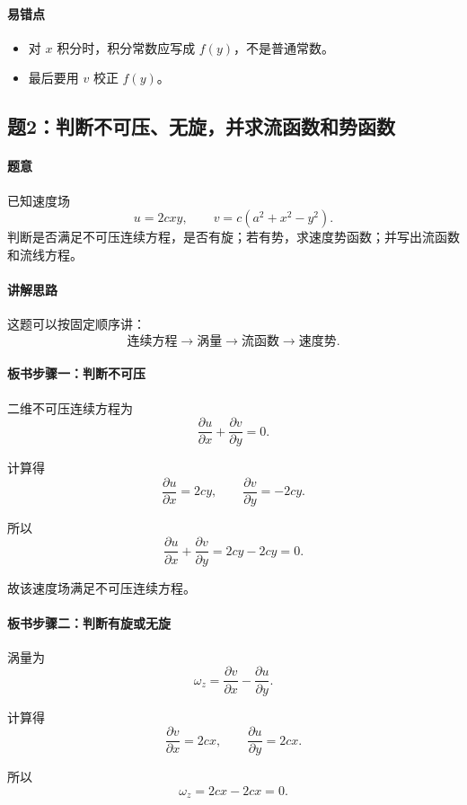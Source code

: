 ﻿\documentclass[12pt,a4paper]{ctexart}
\begin{document}
\paragraph{易错点}
\begin{itemize}
  \item 对 $x$ 积分时，积分常数应写成 $f(y)$，不是普通常数。
  \item 最后要用 $v$ 校正 $f(y)$。
\end{itemize}

\subsection*{题2：判断不可压、无旋，并求流函数和势函数}

\paragraph{题意}
已知速度场
\[
u=2cxy,\qquad
v=c(a^2+x^2-y^2).
\]
判断是否满足不可压连续方程，是否有旋；若有势，求速度势函数；并写出流函数和流线方程。

\paragraph{讲解思路}
这题可以按固定顺序讲：
\[
\text{连续方程}\rightarrow
\text{涡量}\rightarrow
\text{流函数}\rightarrow
\text{速度势}.
\]

\paragraph{板书步骤一：判断不可压}
二维不可压连续方程为
\[
\frac{\partial u}{\partial x}
+\frac{\partial v}{\partial y}=0.
\]

计算得
\[
\frac{\partial u}{\partial x}=2cy,
\qquad
\frac{\partial v}{\partial y}=-2cy.
\]

所以
\[
\frac{\partial u}{\partial x}
+\frac{\partial v}{\partial y}
=2cy-2cy=0.
\]

故该速度场满足不可压连续方程。

\paragraph{板书步骤二：判断有旋或无旋}
涡量为
\[
\omega_z=
\frac{\partial v}{\partial x}
-\frac{\partial u}{\partial y}.
\]

计算得
\[
\frac{\partial v}{\partial x}=2cx,
\qquad
\frac{\partial u}{\partial y}=2cx.
\]

所以
\[
\omega_z=2cx-2cx=0.
\]
\end{document}
